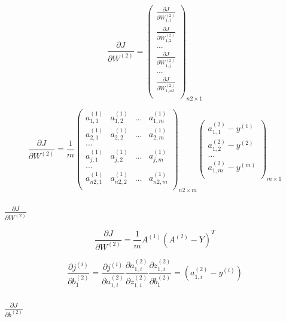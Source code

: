 \documentclass[
]{article}
\begin{document}
\[\frac{\partial{J}}{\partial{W^{(2)}}} = {\begin{pmatrix}
  \frac{\partial{J}}{\partial{W^{(2)}_{1,1}}} \\
  \frac{\partial{J}}{\partial{W^{(2)}_{1,2}}} \\
  ...\\
  \frac{\partial{J}}{\partial{W^{(2)}_{1,j}}} \\
  ...\\
  \frac{\partial{J}}{\partial{W^{(2)}_{1,n2}}} \\
\end{pmatrix}}_{n2×1}\]

\[\frac{\partial{J}}{\partial{W^{(2)}}} = \frac{1}{m}{\begin{pmatrix}
  a^{(1)}_{1,1}  & a^{(1)}_{1,2} & ... & a^{(1)}_{1,m} \\
  a^{(1)}_{2,1}  & a^{(1)}_{2,2} & ... & a^{(1)}_{2,m} \\
  ...\\
  a^{(1)}_{j,1}  & a^{(1)}_{j,2} & ... & a^{(1)}_{j,m} \\
  ...\\
  a^{(1)}_{n2,1}  & a^{(1)}_{n2,2} & ... & a^{(1)}_{n2,m} \\
\end{pmatrix}}_{n2×m}{\begin{pmatrix}
  a^{(2)}_{1,1}-y^{(1)}\\
  a^{(2)}_{1,2}-y^{(2)}\\
  ...\\
  a^{(2)}_{1,m}-y^{(m)}\\
\end{pmatrix}}_{m×1}\]

\hypertarget{header-n67}{%
\subsubsection{\texorpdfstring{\(\frac{\partial J}{\partial W^{(2)}}\)}{\textbackslash frac\{\textbackslash partial J\}\{\textbackslash partial W\^{}\{(2)\}\}}}\label{header-n67}}

\[\frac{\partial{J}}{\partial{W^{(2)}}} = \frac{1}{m}A^{(1)}(A^{(2)}-Y)^{T}\]

\[\frac{\partial{j^{(i)}}}{\partial{b^{(2)}_{1}}} = \frac{\partial{j^{(i)}}}{\partial{a^{(2)}_{1,i}}} \frac{\partial{a^{(2)}_{1,i}}}{\partial{z^{(2)}_{1,i}}}\frac{\partial{z^{(2)}_{1,i}}}{\partial{b^{(2)}_{{1}}}} = (a^{(2)}_{1,i}-y^{(i)})\]

\hypertarget{header-n70}{%
\subsubsection{\texorpdfstring{\(\frac{\partial J}{\partial b^{(2)}}\)}{\textbackslash frac\{\textbackslash partial J\}\{\textbackslash partial b\^{}\{(2)\}\}}}\label{header-n70}}
\end{document}
